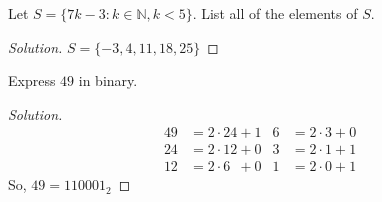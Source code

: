     \begin{problem}
    Let $S = \{7k-3: k \in \mathbb{N}, k < 5\}$. List all of the elements of $S$.
    \end{problem}
    \begin{proof}[Solution]
    \vspace{-0.5\topsep}
    $S = \{-3,4,11,18,25\}$
    \end{proof}
    \begin{problem}
    Express $49$ in binary.
    \end{problem}
    \begin{proof}[Solution]
    \vspace{-\topsep}
    \
    \begin{align*}
        49 &= 2\cdot24+1 & 6&=2\cdot3+0\\
        24&= 2\cdot12+0 & 3&=2\cdot1+1\\
        12&= 2\cdot6\phantom{2}+0 & 1&=2\cdot0+1
    \end{align*}
    So, $49 = 110001_{2}$
    \end{proof} 
